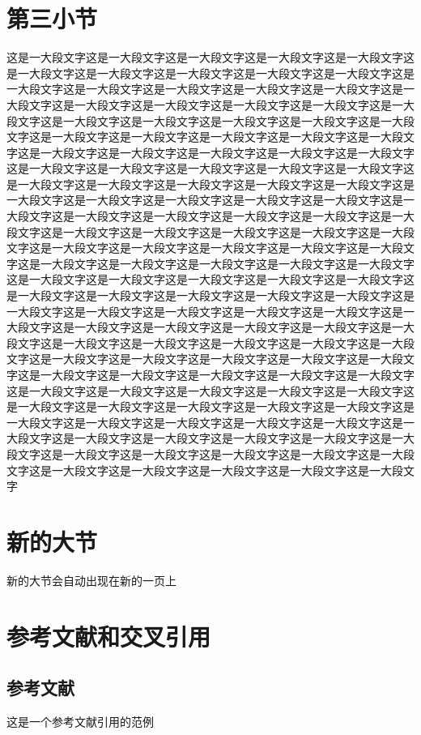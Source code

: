 \documentclass[]{WHUBachelor}
\begin{document}
    \section{第三小节}
	这是一大段文字这是一大段文字这是一大段文字这是一大段文字这是一大段文字这是一大段文字这是一大段文字这是一大段文字这是一大段文字这是一大段文字这是一大段文字这是一大段文字这是一大段文字这是一大段文字这是一大段文字这是一大段文字这是一大段文字这是一大段文字这是一大段文字这是一大段文字这是一大段文字这是一大段文字这是一大段文字这是一大段文字这是一大段文字这是一大段文字这是一大段文字这是一大段文字这是一大段文字这是一大段文字这是一大段文字这是一大段文字这是一大段文字这是一大段文字这是一大段文字这是一大段文字这是一大段文字这是一大段文字这是一大段文字这是一大段文字这是一大段文字这是一大段文字这是一大段文字这是一大段文字这是一大段文字这是一大段文字这是一大段文字这是一大段文字这是一大段文字这是一大段文字这是一大段文字这是一大段文字这是一大段文字这是一大段文字这是一大段文字这是一大段文字这是一大段文字这是一大段文字这是一大段文字这是一大段文字这是一大段文字这是一大段文字这是一大段文字这是一大段文字这是一大段文字这是一大段文字这是一大段文字这是一大段文字这是一大段文字这是一大段文字这是一大段文字这是一大段文字这是一大段文字这是一大段文字这是一大段文字这是一大段文字这是一大段文字这是一大段文字这是一大段文字这是一大段文字这是一大段文字这是一大段文字这是一大段文字这是一大段文字这是一大段文字这是一大段文字这是一大段文字这是一大段文字这是一大段文字这是一大段文字这是一大段文字这是一大段文字这是一大段文字这是一大段文字这是一大段文字这是一大段文字这是一大段文字这是一大段文字这是一大段文字这是一大段文字这是一大段文字这是一大段文字这是一大段文字这是一大段文字这是一大段文字这是一大段文字这是一大段文字这是一大段文字这是一大段文字这是一大段文字这是一大段文字这是一大段文字这是一大段文字这是一大段文字这是一大段文字这是一大段文字这是一大段文字这是一大段文字这是一大段文字这是一大段文字这是一大段文字这是一大段文字这是一大段文字这是一大段文字这是一大段文字这是一大段文字这是一大段文字这是一大段文字这是一大段文字这是一大段文字这是一大段文字这是一大段文字这是一大段文字这是一大段文字这是一大段文字这是一大段文字这是一大段文字这是一大段文字这是一大段文字
	\section{新的大节}
	新的大节会自动出现在新的一页上
	\section{参考文献和交叉引用}\label{sec:ref}
	\subsection{参考文献}
    这是一个参考文献引用的范例\cite{Stone_1998}

    
\end{document}
